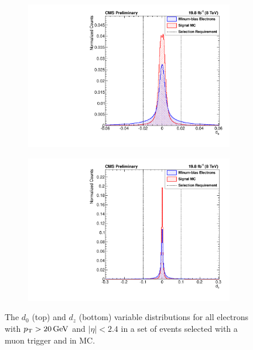 \begin{figure}[!htbp]
    \centering
    \begin{subfigure}[b]{\StackedPlotWidth}
        \includegraphics[width=\textwidth]{figures/e_reco_var_d0.pdf}
        \caption{}
        \label{fig:d0}
    \end{subfigure}
    \begin{subfigure}[b]{\StackedPlotWidth}
        \includegraphics[width=\textwidth]{figures/e_reco_var_dz.pdf}
        \caption{}
        \label{fig:dz}
    \end{subfigure}
    \caption[
        Distributions of $d_{0}$ and $d_{z}$ in data and MC.
    ]{
        The $d_{0}$ (top) and $d_{z}$ (bottom) variable distributions for all
        electrons with $p_{\mathrm{T}} > 20 \,\text{Ge\hspace{-.08em}V}$ and $|\eta| < 2.4$ in a set of events
        selected with a muon trigger and in \MADGRAPH \Ztoee MC.
    }
    \label{fig:d0_dz}
\end{figure}
